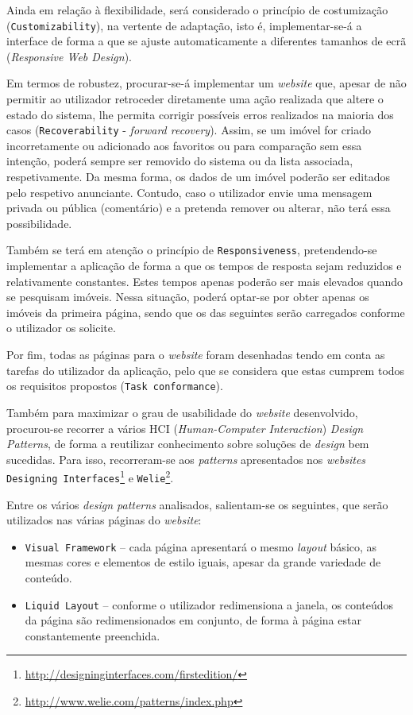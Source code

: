 Ainda em relação à flexibilidade, será considerado o princípio de costumização (\texttt{Customizability}), na vertente de adaptação, isto é, implementar-se-á a interface de forma a que se ajuste automaticamente a diferentes tamanhos de ecrã (\textit{Responsive Web Design}).

Em termos de robustez, procurar-se-á implementar um \textit{website} que, apesar de não permitir ao utilizador retroceder diretamente uma ação realizada que altere o estado do sistema, lhe permita corrigir possíveis erros realizados na maioria dos casos (\texttt{Recoverability} - \textit{forward recovery}). Assim, se um imóvel for criado incorretamente ou adicionado aos favoritos ou para comparação sem essa intenção, poderá sempre ser removido do sistema ou da lista associada, respetivamente. Da mesma forma, os dados de um imóvel poderão ser editados pelo respetivo anunciante. Contudo, caso o utilizador envie uma mensagem privada ou pública (comentário) e a pretenda remover ou alterar, não terá essa possibilidade.

Também se terá em atenção o princípio de \texttt{Responsiveness}, pretendendo-se implementar a aplicação de forma a que os tempos de resposta sejam reduzidos e relativamente constantes. Estes tempos apenas poderão ser mais elevados quando se pesquisam imóveis. Nessa situação, poderá optar-se por obter apenas os imóveis da primeira página, sendo que os das seguintes serão carregados conforme o utilizador os solicite.

Por fim, todas as páginas para o \textit{website} foram desenhadas tendo em conta as tarefas do utilizador da aplicação, pelo que se considera que estas cumprem todos os requisitos propostos (\texttt{Task conformance}).

Também para maximizar o grau de usabilidade do \textit{website} desenvolvido, procurou-se recorrer a vários HCI (\textit{Human-Computer Interaction}) \textit{Design Patterns}, de forma a reutilizar conhecimento sobre soluções de \textit{design} bem sucedidas. Para isso, recorreram-se aos \textit{patterns} apresentados nos \textit{websites} \texttt{Designing Interfaces}\footnote{\url{http://designinginterfaces.com/firstedition/}} e \texttt{Welie}\footnote{\url{http://www.welie.com/patterns/index.php}}.

Entre os vários \textit{design patterns} analisados, salientam-se os seguintes, que serão utilizados nas várias páginas do \textit{website}:
\begin{itemize}
    \item \texttt{Visual Framework} -- cada página apresentará o mesmo \textit{layout} básico, as mesmas cores e elementos de estilo iguais, apesar da grande variedade de conteúdo.
    \item \texttt{Liquid Layout} -- conforme o utilizador redimensiona a janela, os conteúdos da página são redimensionados em conjunto, de forma à página estar constantemente preenchida.
\end{itemize} 

